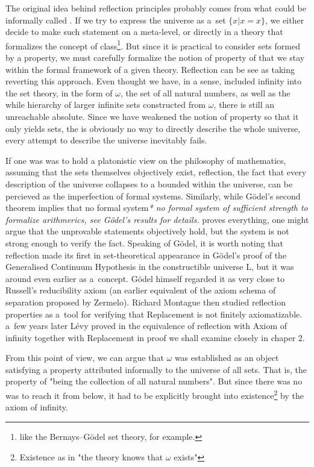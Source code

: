 The original idea behind reflection principles probably comes from what could be informally called .
If we try to express the universe as a~set $\{x  |  x = x\}$, we either decide to make such statement on a meta-level, or directly in a theory that formalizes the concept of class\footnote{like the Bernays–Gödel set theory, for example.}. But since it is practical to consider sets formed by a property, we must carefully formalize the notion of property of that we stay within the formal framework of a given theory. Reflection can be see as taking reverting this approach. Even thought we have, in a sense, included infinity into the set theory, in the form of $\omega$, the set of all natural numbers, as well as the while hierarchy of larger infinite sets constructed from $\omega$, there is still an unreachable absolute. Since we have weakened the notion of property so that it only yields sets, the is obviously no way to directly describe the whole universe, every attempt to describe the universe inevitably fails.

If one was was to hold a platonistic view on the philosophy of mathematics, assuming that the sets themselves objectively exist, reflection, the fact that every description of the universe collapses to a bounded within the universe, can be percieved as the imperfection of formal systems. Similarly, while Gödel's second theorem implies that no formal system\emph{* no formal system of sufficient strength to formalize arithmerics, see Gödel's results for details.} proves everything, one might argue that the unprovable statements objectively hold, but the system is not strong enough to verify the fact. Speaking of Gödel, it is worth noting that reflection made its first in set-theoretical appearance in G{\"o}del's proof of the Generalised Continuum Hypothesis in the constructible universe L, but it was around even earlier as a~concept. G{\"o}del himself regarded it as very close to Russell's reducibility axiom (an earlier equivalent of the axiom schema of separation proposed by Zermelo). Richard Montague then studied reflection properties as a~tool for verifying that Replacement is not finitely axiomatizable. a~few years later Lévy proved in \cite{Levy60a} the equivalence of reflection with Axiom of infinity together with Replacement in proof we shall examine closely in chaper 2.

From this point of view, we can argue that $\omega$ was established as an object satisfying a property attributed informally to the universe of all sets. That is, the property of "being the collection of all natural numbers". But since there was no was to reach it from below, it had to be explicitly brought into existence\footnote{Existence as in "the theory knows that $\omega$ exists"} by the axiom of infinity. 

